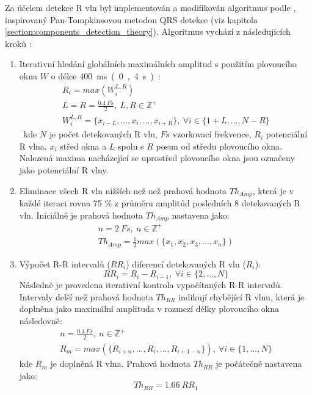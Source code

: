 Za účelem detekce R vln byl implementován a modifikován algoritmus podle
\cite{Nabian2018}, inspirovaný Pan-Tompkinsovou metodou QRS detekce
\cite{Pan1985} (viz kapitola \ref{section:components_detection_theory}).
Algoritmus vychází z následujících kroků \cite{Nabian2018}:
\begin{enumerate}
    \item Iterativní hledání globálních maximálních amplitud s použitím
          plovoucího okna $W$ o délce 400~\si\ms~(0,4~\si\s):
          \begin{gather}
              R_i = max(W_i^{L,R}) \nonumber \\
              L = R = \frac{0.4~Fs}{2}, ~L,R \in \mathbb{Z^+} \nonumber \\
              W_i^{L,R} = \{x_{i-L},...,x_i,...,x_{i+R}\}, ~\forall i \in \{1+L,...,N-R\}
          \end{gather}
          kde $N$ je počet detekovaných R vln, $Fs$ vzorkovací frekvence, $R_i$
          potenciální R vlna, $x_i$ střed okna a $L$ spolu s $R$ posun od středu
          plovoucího okna. Nalezená maxima nacházející se uprostřed plovoucího
          okna jsou označeny jako potenciální R vlny.
    \item Eliminace všech R vln nižších než než prahová hodnota $Th_{Amp}$, která je v
          každé iteraci rovna 75 \% z průměru amplitůd posledních 8 detekovaných
          R vln. Iniciálně je prahová hodnota $Th_{Amp}$ nastavena jako:
          \begin{gather}
              n = 2~Fs, ~n \in \mathbb{Z^+} \nonumber \\
              Th_{Amp} = \frac{1}{3} max(\{x_1,x_2,x_3,...,x_n\})
          \end{gather}
    \item Výpočet R-R intervalů ($RR_i$) diferencí detekovaných R vln ($R_i$):
          \begin{equation}
              RR_i = R_{i} - R_{i-1}, ~\forall i \in \{2,...,N\}
          \end{equation}
          Následně je provedena iterativní kontrola vypočítaných R-R intervalů.
          Intervaly delší než prahová hodnota $Th_{RR}$ indikují chybějící R
          vlnu, která je doplněna jako maximální amplituda v rozmezí délky
          plovoucího okna následovně:
          \begin{gather}
              n = \frac{0.4~Fs}{2}, ~n \in \mathbb{Z^+} \nonumber \\
              R_m = max(\{R_{i+n},...,R_i,...,R_{i+1-n}\}), ~\forall i \in \{1,...,N\}
          \end{gather}
          kde $R_m$ je doplněná R vlna. Prahová hodnota $Th_{RR}$ je počátečně
          nastavena jako:
          \begin{equation}
              Th_{RR} = 1.66~RR_1
          \end{equation}
\end{enumerate}

